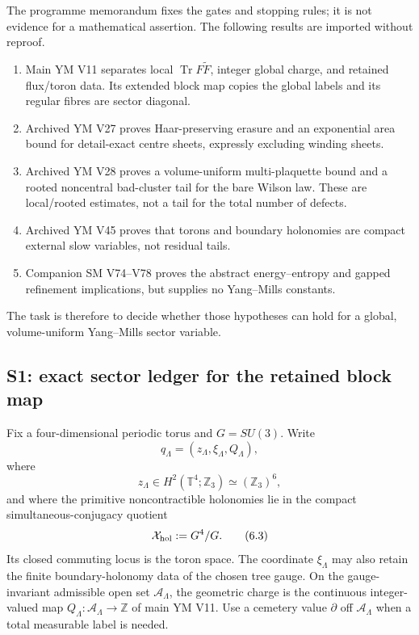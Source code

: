 \documentclass[11pt]{article}
\theoremstyle{definition}
\theoremstyle{remark}
\newcommand{\cA}{\mathcal A}
\begin{document}
The programme memorandum fixes the gates and stopping rules; it is not
evidence for a mathematical assertion.  The following results are imported
without reproof.
\begin{enumerate}[label=\textup{(S\arabic*)},leftmargin=4em]
\item Main YM V11 separates local $\operatorname{Tr}F\widetilde F$, integer
      global charge, and retained flux/toron data.  Its extended block map
      copies the global labels and its regular fibres are sector diagonal.
\item Archived YM V27 proves Haar-preserving erasure and an exponential area
      bound for detail-exact centre sheets, expressly excluding winding
      sheets.
\item Archived YM V28 proves a volume-uniform multi-plaquette bound and a
      rooted noncentral bad-cluster tail for the bare Wilson law.  These are
      local/rooted estimates, not a tail for the total number of defects.
\item Archived YM V45 proves that torons and boundary holonomies are compact
      external slow variables, not residual tails.
\item Companion SM V74--V78 proves the abstract energy--entropy and gapped
      refinement implications, but supplies no Yang--Mills constants.
\end{enumerate}
The task is therefore to decide whether those hypotheses can hold for a
global, volume-uniform Yang--Mills sector variable.

\subsection{S1: exact sector ledger for the retained block map}

Fix a four-dimensional periodic torus and $G=SU(3)$.  Write
\[
 q_\Lambda=(z_\Lambda,\xi_\Lambda,Q_\Lambda),                \tag{6.2}
\]
where
\[
 z_\Lambda\in H^2(\mathbb T^4;\mathbb Z_3)
                 \simeq(\mathbb Z_3)^6,
\]
and where the primitive noncontractible holonomies lie in the compact
simultaneous-conjugacy quotient
\[
 {\cal X}_{\rm hol}:=G^4/G.                                  \tag{6.3}
\]
Its closed commuting locus is the toron space.  The coordinate
$\xi_\Lambda$ may also retain the finite boundary-holonomy data of the
chosen tree gauge.  On the gauge-invariant admissible open set
$\cA_\Lambda$, the geometric charge is the continuous integer-valued map
$Q_\Lambda:\cA_\Lambda\to\mathbb Z$ of main YM V11.  Use a cemetery value
$\partial$ off $\cA_\Lambda$ when a total measurable label is needed.
\end{document}
